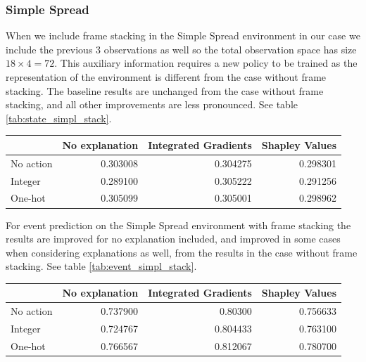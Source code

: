 \documentclass[UKenglish]{uiomasterthesis}
\begin{document}
\subsubsection{Simple Spread}
\label{sec:simpl_exp3}
When we include frame stacking in the Simple Spread environment in our case we include the previous 3 observations as well so the total observation space has size $18\times 4 = 72$. This auxiliary information requires a new policy to be trained as the representation of the environment is different from the case without frame stacking. The baseline results are unchanged from the case without frame stacking, and all other improvements are less pronounced. See table \ref{tab:state_simpl_stack}.

\begin{center}
\label{tab:state_simpl_stack}
\begin{tabular}{lrrr}
\toprule
 & No explanation & Integrated Gradients & Shapley Values \\
\midrule
No action & 0.303008 & 0.304275 & 0.298301 \\
Integer & 0.289100 & 0.305222 & 0.291256 \\
One-hot & 0.305099 & 0.305001 & 0.298962 \\
\bottomrule
\end{tabular}
\end{center}

For event prediction on the Simple Spread environment with frame stacking the results are improved for no explanation included, and improved in some cases when considering explanations as well, from the results in the case without frame stacking. See table \ref{tab:event_simpl_stack}.


\begin{center}
\label{tab:event_simpl_stack}
\begin{tabular}{lrrr}
\toprule
 & No explanation & Integrated Gradients & Shapley Values \\
\midrule
No action & 0.737900 & 0.80300 & 0.756633 \\
Integer & 0.724767 & 0.804433 & 0.763100 \\
One-hot & 0.766567 & 0.812067 & 0.780700 \\
\bottomrule
\end{tabular}
\end{center}
\end{document}
